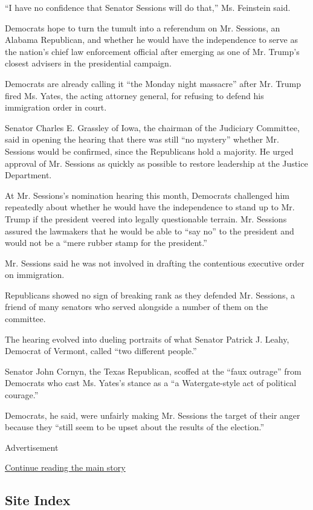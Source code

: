 ``I have no confidence that Senator Sessions will do that,'' Ms.
Feinstein said.

Democrats hope to turn the tumult into a referendum on Mr. Sessions, an
Alabama Republican, and whether he would have the independence to serve
as the nation's chief law enforcement official after emerging as one of
Mr. Trump's closest advisers in the presidential campaign.

Democrats are already calling it ``the Monday night massacre'' after Mr.
Trump fired Ms. Yates, the acting attorney general, for refusing to
defend his immigration order in court.

Senator Charles E. Grassley of Iowa, the chairman of the Judiciary
Committee, said in opening the hearing that there was still ``no
mystery'' whether Mr. Sessions would be confirmed, since the Republicans
hold a majority. He urged approval of Mr. Sessions as quickly as
possible to restore leadership at the Justice Department.

At Mr. Sessions's nomination hearing this month, Democrats challenged
him repeatedly about whether he would have the independence to stand up
to Mr. Trump if the president veered into legally questionable terrain.
Mr. Sessions assured the lawmakers that he would be able to ``say no''
to the president and would not be a ``mere rubber stamp for the
president.''

Mr. Sessions said he was not involved in drafting the contentious
executive order on immigration.

Republicans showed no sign of breaking rank as they defended Mr.
Sessions, a friend of many senators who served alongside a number of
them on the committee.

The hearing evolved into dueling portraits of what Senator Patrick J.
Leahy, Democrat of Vermont, called ``two different people.''

Senator John Cornyn, the Texas Republican, scoffed at the ``faux
outrage'' from Democrats who cast Ms. Yates's stance as a ``a
Watergate-style act of political courage.''

Democrats, he said, were unfairly making Mr. Sessions the target of
their anger because they ``still seem to be upset about the results of
the election.''

Advertisement

\protect\hyperlink{after-bottom}{Continue reading the main story}

\hypertarget{site-index}{%
\subsection{Site Index}\label{site-index}}

